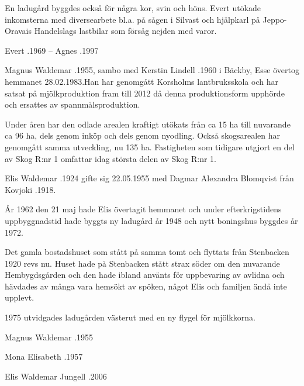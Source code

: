 En ladugård byggdes också för några kor, svin och höns. Evert utökade inkomsterna med diversearbete bl.a. på sågen i Silvast och hjälpkarl på
Jeppo-Oravais Handelslags lastbilar som försåg nejden med varor.

Evert .1969   --    Agnes .1997





Magnus Waldemar .1955, sambo med Kerstin Lindell .1960 i Bäckby, Esse övertog hemmanet 28.02.1983.Han har genomgått Korsholms lantbruksskola och har satsat på mjölkproduktion fram till 2012 då denna produktionsform upphörde och ersattes av spannmålsproduktion.

Under åren har den odlade arealen kraftigt utökats från ca 15 ha till nuvarande ca 96 ha, dels genom inköp och dels genom nyodling. Också skogsarealen har genomgått samma utveckling, nu 135 ha. Fastigheten som tidigare utgjort en del av Skog R:nr 1 omfattar idag största delen av Skog R:nr 1.


Elis Waldemar .1924 gifte sig 22.05.1955 med Dagmar Alexandra Blomqvist från Kovjoki .1918.

År 1962 den 21 maj hade Elis övertagit hemmanet och under efterkrigstidens uppbyggnadstid hade byggts ny ladugård år 1948 och nytt boningshus byggdes år 1972.

Det gamla bostadshuset som stått på samma tomt och flyttats från Stenbacken 1920 revs nu. Huset hade på Stenbacken stått strax söder om den nuvarande Hembygdsgården och den hade ibland använts för uppbevaring av avlidna och hävdades av många vara hemsökt av spöken, något Elis och familjen ändå inte upplevt.

1975 utvidgades ladugården västerut med en ny flygel för mjölkkorna.

\begin{jhchildren}
  \item{Magnus Waldemar}{ .1955}
  \item{Mona Elisabeth}{ .1957}
\end{jhchildren}

Elis Waldemar Jungell .2006



